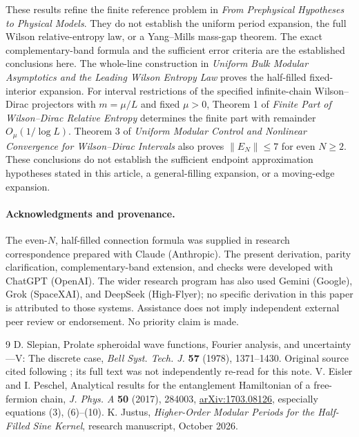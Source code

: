 \documentclass[10pt]{article}
\begin{document}
These results refine the finite reference problem in
\emph{From Prephysical Hypotheses to Physical Models}.
They do not establish the uniform period expansion, the full Wilson
relative-entropy law, or a Yang--Mills mass-gap theorem.
The exact complementary-band formula and the sufficient error criteria
are the established conclusions here. The whole-line construction in \emph{Uniform Bulk Modular Asymptotics
and the Leading Wilson Entropy Law} proves the half-filled
fixed-interior expansion. For interval restrictions of the specified
infinite-chain Wilson--Dirac projectors with \(m=\mu/L\) and fixed
\(\mu>0\), Theorem 1 of \emph{Finite Part of Wilson--Dirac Relative
Entropy} determines the finite part with remainder \(O_\mu(1/\log L)\).
Theorem 3 of \emph{Uniform Modular Control and Nonlinear Convergence for
Wilson--Dirac Intervals} also proves \(\|E_N\|\le7\) for even \(N\ge2\).
These conclusions do not establish the sufficient endpoint approximation
hypotheses stated in this article, a general-filling expansion, or a
moving-edge expansion.

\paragraph{Acknowledgments and provenance.}
The even-$N$, half-filled connection formula was supplied in research
correspondence prepared with Claude (Anthropic).
The present derivation, parity clarification, complementary-band extension,
and checks were developed with ChatGPT (OpenAI).
The wider research program has also used Gemini (Google),
Grok (SpaceXAI), and DeepSeek (High-Flyer); no specific derivation in this
paper is attributed to those systems. Assistance does not imply
independent external peer review or endorsement. No priority claim is made.

\begin{thebibliography}{9}
 D. Slepian, Prolate spheroidal wave functions, Fourier
analysis, and uncertainty---V: The discrete case,
\emph{Bell Syst. Tech. J.} \textbf{57} (1978), 1371--1430.
Original source cited following \cite{eisler}; its full text was not
independently re-read for this note.
 V. Eisler and I. Peschel,
Analytical results for the entanglement Hamiltonian of a free-fermion chain,
\emph{J. Phys. A} \textbf{50} (2017), 284003,
\href{https://arxiv.org/abs/1703.08126}{arXiv:1703.08126},
especially equations (3), (6)--(10).
 K. Justus,
\emph{Higher-Order Modular Periods for the Half-Filled Sine Kernel},
research manuscript, October 2026.
\end{thebibliography}
\end{document}
